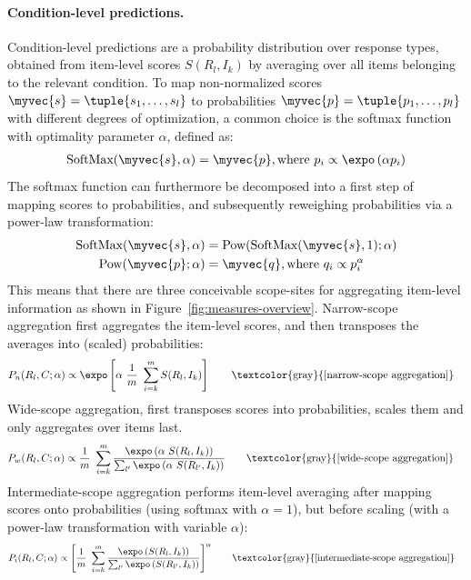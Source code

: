 \documentclass{article}
\begin{document}
\paragraph{Condition-level predictions.}
Condition-level predictions are a probability distribution over response types, obtained from item-level scores $S(R_{l}, I_{k})$ by averaging over all items belonging to the relevant condition.
To map non-normalized scores $\myvec{s} = \tuple{s_{1}, \dots, s_{l}}$ to probabilities $\myvec{p} = \tuple{p_{1}, \dots, p_{l}}$ with different degrees of optimization, a common choice is the softmax function with optimality parameter $\alpha$, defined as:
%
\begin{align*}
 \text{SoftMax}(\myvec{s}, \alpha) = \myvec{p}, \text{where } p_{i} \propto \expo \left (\alpha p_{i} \right )
\end{align*}
%
The softmax function can furthermore be decomposed into a first step of mapping scores to probabilities, and subsequently reweighing probabilities via a power-law transformation:
%
\begin{align*}
  \text{SoftMax}(\myvec{s}, \alpha) & = \text{Pow}( \text{SoftMax}(\myvec{s}, 1) ; \alpha) \\
  \text{Pow}(\myvec{p} ; \alpha) & = \myvec{q}, \text{where } q_{i} \propto p_{i}^{\alpha}
\end{align*}
%
This means that there are three conceivable scope-sites for aggregating item-level information as shown in Figure~\ref{fig:measures-overview}.
Narrow-scope aggregation first aggregates the item-level scores, and then transposes the averages into (scaled) probabilities:
%
\begin{align*}
  & P_{n}(R_{l}, C ; \alpha) \propto \expo \left [  \alpha \ \frac{1}{m} \ \sum_{i = k}^{m} S(R_{l}, I_{k})  \right ]
    \tag*{\textcolor{gray}{[narrow-scope aggregation]}}
\end{align*}
%
Wide-scope aggregation, first transposes scores into probabilities, scales them and only aggregates over items last.
\begin{align*}
  & P_{w}(R_{l}, C ; \alpha) \propto \frac{1}{m} \ \sum_{i = k}^{m} \frac{\expo \left( \alpha \ S(R_{l}, I_{k}) \right )}{ \sum_{l'} \expo \left( \alpha \ S(R_{l'}, I_{k}) \right )}
    \tag*{\textcolor{gray}{[wide-scope aggregation]}}
\end{align*}
%
Intermediate-scope aggregation performs item-level averaging after mapping scores onto probabilities (using softmax with $\alpha=1$), but before scaling (with a power-law transformation with variable $\alpha$):
\begin{align*}
  & P_{i}(R_{l}, C ; \alpha) \propto  \left [ \frac{1}{m} \ \sum_{i = k}^{m} \frac{\expo \left( S(R_{l}, I_{k}) \right )}{ \sum_{l'} \expo \left( S(R_{l'}, I_{k}) \right )} \right ]^{\alpha}
    \tag*{\textcolor{gray}{[intermediate-scope aggregation]}}
\end{align*}
\end{document}
